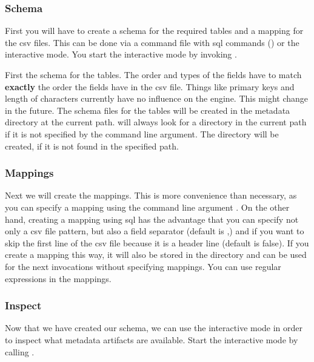 \subsubsection{Schema}
First you will have to create a schema for the required tables and a mapping for the csv files. This can be done via a command file with sql commands () or the interactive mode. You start the interactive mode by invoking .

First the schema for the tables. The order and types of the fields have to match \textbf{exactly} the order the fields have in the csv file. Things like primary keys and length of characters currently have no influence on the engine. This might change in the future. The schema files for the tables will be created in the  metadata directory at the current path. \csvsqldb{} will always look for a  directory in the current path if it is not specified by the  command line argument. The  directory will be created, if it is not found in the specified path.


\subsubsection{Mappings}
Next we will create the mappings. This is more convenience than necessary, as you can specify a mapping using the command line argument . On the other hand, creating a mapping using sql has the advantage that you can specify not only a csv file pattern, but also a field separator (default is ,) and if you want to skip the first line of the csv file because it is a header line (default is false). If you create a mapping this way, it will also be stored in the  directory and can be used for the next \csvsqldb{} invocations without specifying mappings. You can use regular expressions in the mappings.


\subsubsection{Inspect}
Now that we have created our schema, we can use the interactive mode in order to inspect what metadata artifacts are available. Start the interactive mode by calling .

